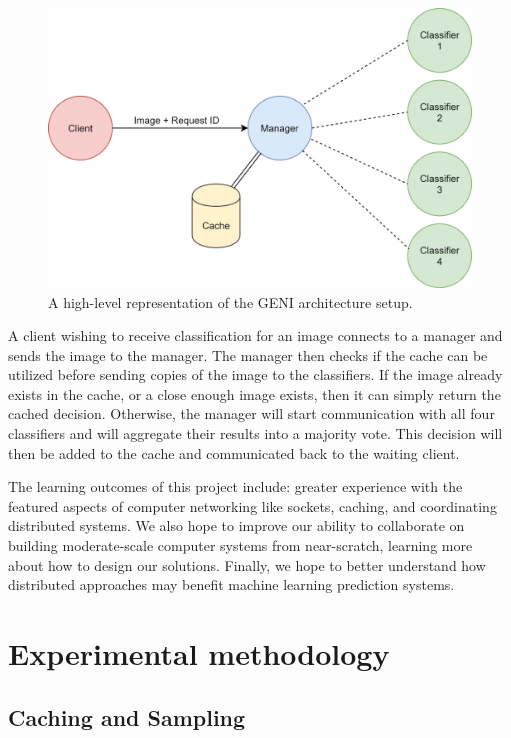 \documentclass[11pt]{article}
\begin{document}
\begin{figure}
    \centering
    \includegraphics[scale=0.12]{networksArchitecture.png}
    \caption{A high-level representation of the GENI architecture setup.}
    \label{fig:architecture}
\end{figure}

A client wishing to receive classification for an image connects to a manager and sends the image to the manager. The manager then checks if the cache can be utilized before sending copies of the image to the classifiers. If the image already exists in the cache, or a close enough image exists, then it can simply return the cached decision. Otherwise, the manager will start communication with all four classifiers and will aggregate their results into a majority vote. This decision will then be added to the cache and communicated back to the waiting client.

The learning outcomes of this project include: greater experience with the featured aspects of computer networking like sockets, caching, and coordinating distributed systems.
We also hope to improve our ability to collaborate on building moderate-scale computer systems from near-scratch, learning more about how to design our solutions.
Finally, we hope to better understand how distributed approaches may benefit machine learning prediction systems.

\section{Experimental methodology}

\subsection{Caching and Sampling}
\end{document}
